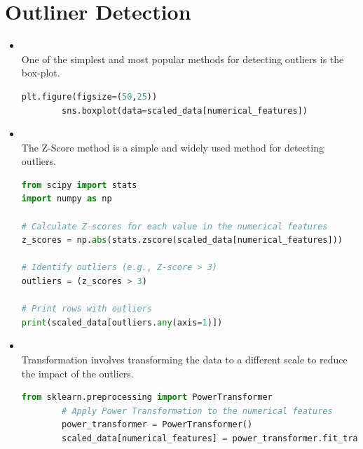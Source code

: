 \documentclass{article}
\begin{document}
\section{Outliner Detection}
\begin{itemize}
    \item \textbf{\textcolor{blue}{}}\\
    One of the simplest and most popular methods for detecting outliers is the box-plot.
    \begin{center}
    \begin{lstlisting}[language=Python, caption={Logistic Regression Example}, label={lst:logreg}, backgroundcolor=\color{gray!10}, frame=single, keywordstyle=\color{blue}\bfseries, commentstyle=\color{green!50!black}, stringstyle=\color{orange}]
        plt.figure(figsize=(50,25))
        sns.boxplot(data=scaled_data[numerical_features])
    \end{lstlisting}
    \end{center}
    \item \textbf{\textcolor{blue}{}}\\
    The Z-Score method is a simple and widely used method for detecting outliers.
    \begin{center}
        \begin{lstlisting}[language=Python, caption={Logistic Regression Example}, label={lst:logreg}, backgroundcolor=\color{gray!10}, frame=single, keywordstyle=\color{blue}\bfseries, commentstyle=\color{green!50!black}, stringstyle=\color{orange}]
from scipy import stats
import numpy as np

# Calculate Z-scores for each value in the numerical features
z_scores = np.abs(stats.zscore(scaled_data[numerical_features]))

# Identify outliers (e.g., Z-score > 3)
outliers = (z_scores > 3)

# Print rows with outliers
print(scaled_data[outliers.any(axis=1)])
\end{lstlisting}
\end{center}
 \item \textbf{\textcolor{blue}{}}\\
 Transformation involves transforming the data to a different scale to reduce the impact of the outliers.   
 \begin{center}
    \begin{lstlisting}[language=Python, caption={Logistic Regression Example}, label={lst:logreg}, backgroundcolor=\color{gray!10}, frame=single, keywordstyle=\color{blue}\bfseries, commentstyle=\color{green!50!black}, stringstyle=\color{orange}]
        from sklearn.preprocessing import PowerTransformer
        # Apply Power Transformation to the numerical features  
        power_transformer = PowerTransformer()
        scaled_data[numerical_features] = power_transformer.fit_transform(scaled_data[numerical_features])    
    \end{lstlisting}    
    \end{center}
\end{itemize}
\end{document}
